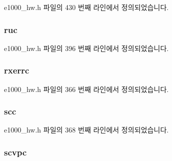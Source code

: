 e1000\+\_\+hw.\+h 파일의 430 번째 라인에서 정의되었습니다.

\subsubsection[{\texorpdfstring{ruc}{ruc}}]{ ruc}\hypertarget{structe1000__hw__stats_ae89bad4f3c7d30018333da9705e86c5b}{}\label{structe1000__hw__stats_ae89bad4f3c7d30018333da9705e86c5b}


e1000\+\_\+hw.\+h 파일의 396 번째 라인에서 정의되었습니다.

\subsubsection[{\texorpdfstring{rxerrc}{rxerrc}}]{ rxerrc}\hypertarget{structe1000__hw__stats_a3ccead9a9c9012010c58a0a2f8629f81}{}\label{structe1000__hw__stats_a3ccead9a9c9012010c58a0a2f8629f81}


e1000\+\_\+hw.\+h 파일의 366 번째 라인에서 정의되었습니다.

\subsubsection[{\texorpdfstring{scc}{scc}}]{ scc}\hypertarget{structe1000__hw__stats_ab7a906eeddb92af4758ab3b234305f83}{}\label{structe1000__hw__stats_ab7a906eeddb92af4758ab3b234305f83}


e1000\+\_\+hw.\+h 파일의 368 번째 라인에서 정의되었습니다.

\subsubsection[{\texorpdfstring{scvpc}{scvpc}}]{ scvpc}\hypertarget{structe1000__hw__stats_a76f9e6aedadaae77d784c343e1a4fe06}{}\label{structe1000__hw__stats_a76f9e6aedadaae77d784c343e1a4fe06}


